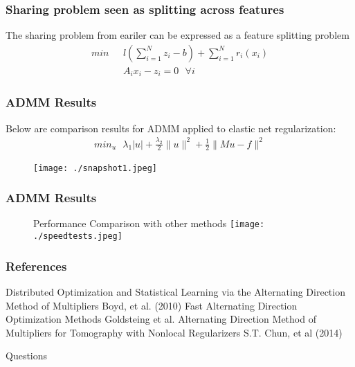\documentclass{beamer}
\begin{document}
\begin{frame}
  \frametitle{Sharing problem seen as splitting across features}
  The sharing problem from eariler can be expressed as a feature splitting problem
  \begin{align}
    min \: \: \: &l\left( \sum_{i=1}^{N} z_{i} - b  \right) + \sum_{i=1}^{N} r_{i}(x_{i}) \\
    & A_{i}x_{i} - z_{i} = 0 \: \: \: \forall i
  \end{align}
\end{frame}


\begin{frame}
  \frametitle{ADMM Results}
  Below are comparison results for ADMM applied to elastic net regularization:
  \begin{align}
    min_{u} \: \: \: \lambda_{1} |u| + \frac{\lambda_{2}}{2} \|u\|^{2} + \frac{1}{2}\|Mu-f\|^{2}
  \end{align}
  \begin{figure}[]
    \centering
    \texttt{[image: ./snapshot1.jpeg]}
  \end{figure}
\end{frame}

\begin{frame}
  \frametitle{ADMM Results}

  \begin{figure}[]
    Performance Comparison with other methods
    \centering
    \texttt{[image: ./speedtests.jpeg]}
  \end{figure}
\end{frame}







\begin{frame}
\frametitle{References}
\begin{thebibliography}{99}
 Distributed Optimization and Statistical Learning via the Alternating Direction Method of Multipliers Boyd, et al. (2010)
 Fast Alternating Direction Optimization Methods Goldsteing et al. 
 Alternating Direction Method of Multipliers for Tomography with Nonlocal Regularizers S.T. Chun, et al (2014)
\end{thebibliography}
\end{frame}


\begin{frame}
\Huge{\centerline{Questions}}
\end{frame}

\end{document}
